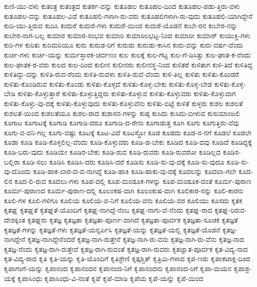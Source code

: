 {ಕುಣಿ-ಯು-ವಳು
ಕುತಂತ್ರ
ಕುತಂತ್ರದ
ಕುತರ್ಕ-ವನ್ನು
ಕುತೂಹಲ
ಕುತೂಹಲ-ದಿಂದ
ಕುತೂಹಲ-ಪಡು-ತ್ತಿರು-ವಳು
ಕುತೂಹಲ-ವನ್ನು
ಕುತೂಹಲ-ವಿದೆ
ಕುತೂಹಲಿ-ಗಳಾಗಿ-ರು-ವರು
ಕುತೂಹಲಿಗಳಾಗಿ-ರು-ವುದು
ಕುತೂಹಲಿ-ಯಾಗಿದ್ದೇನೆ
ಕುದಿ-ಯು-ತ್ತಿರುವ
ಕುದಿಸಿ
ಕುದುರೆ
ಕುದುರೆ-ಗಳು
ಕುದುರೆ-ಯಿಂದ
ಕುದುರೆ-ಯೊಡನೆ
ಕುಬೇ-ರನ
ಕುಬೇರ-ನನ್ನು
ಕುಬೇರ-ನಾಗ-ಬಲ್ಲ
ಕುಮಾರ
ಕುಮಾರ-ಸಂಭವ
ಕುಮಾರಿ
ಕುಮಾರಿಲಭಟ್ಟ-ನಿಂದ
ಕುಮಾರೀ
ಕುಮಾರ್
ಕುಯುಕ್ತಿ-ಗಳು
ಕುರಿ-ಗಳ
ಕುರಿತು
ಕುರಿಮರಿಯೂ
ಕುರು
ಕುರುಡ-ರಿಗೆ
ಕುರುಡು
ಕುರುಡು-ಕಾಸಿನ
ಕುರು-ವನ್ನು
ಕುರು-ವರ್ಷ-ವೆಂದು
ಕುರ್ಚಿ-ಗಳು
ಕುರ್ಚಿ-ಯನ್ನು
ಕುರ್ಮಸ್ತಾರಕ-ಚರ್ವಣಂ
ಕುಲ
ಕುಲಕ್ಕೆ
ಕುಲ-ಗೆಟ್ಟ
ಕುಲ-ಗೆ-ಡಿಸಿತ್ತು
ಕುಲ-ಘಾತ-ಕ-ನೆಂದು
ಕುಲ-ಘಾತಕ-ರ-ವರು
ಕುಲದ
ಕುಲ-ದಿಂದ
ಕುಲೀನ
ಕುಲೀನರು
ಕುಲೀನಸ್ಥ-ನಿಂದ
ಕುಳಿತರೆ
ಕುಳಿತಾಗ
ಕುಳಿ-ತಿದೆ
ಕುಳಿತಿದ್ದ
ಕುಳಿತಿದ್ದು-ದನ್ನು
ಕುಳಿತಿ-ರುವ-ರೆಂದು
ಕುಳಿತಿ-ರುವಳು
ಕುಳಿತಿ-ರುವೆ-ವೆಂದು
ಕುಳಿ-ತಿಲ್ಲ
ಕುಳಿತು
ಕುಳಿತು-ಕೊಂಡರೆ
ಕುಳಿತು-ಕೊಂಡಿರುವ
ಕುಳಿತು-ಕೊಂಡು
ಕುಳಿತು-ಕೊಳ್ಳದೆ
ಕುಳಿತು-ಕೊಳ್ಳ-ಬೇಕು
ಕುಳಿತು-ಕೊಳ್ಳ-ಬೇಡ
ಕುಳಿತು-ಕೊಳ್ಳ-ಬೇಡಿ
ಕುಳಿತು-ಕೊಳ್ಳುತ್ತಾರೆ
ಕುಳಿತು-ಕೊಳ್ಳುತ್ತಿದ್ದರು
ಕುಳಿತು-ಕೊಳ್ಳುವ
ಕುಳಿತು-ಕೊಳ್ಳುವರು
ಕುಳಿತು-ಕೊಳ್ಳುವಾಗ
ಕುಳಿತು-ಕೊಳ್ಳು-ವು-ದಕ್ಕೆ
ಕುಳಿತು-ಕೊಳ್ಳುವುದು
ಕುಳಿತು-ಕೊಳ್ಳುವೆನು
ಕುಳಿತು-ಬಿಟ್ಟೆ
ಕುಳಿತೆ
ಕುಳ್ಳರು
ಕುಶಲ
ಕುಶಲತೆ
ಕುಶಲತೆ-ಯಿಂದ
ಕುಶಲತೆಯೂ
ಕುಶಲ-ರಾದ
ಕುಶಾಸನ-ಗಳನ್ನು
ಕುಷ್ಠ
ಕುಸಿದು
ಕುಸಿದು-ಬೀಳುವ
ಕುಸುಮಾಂಜಲಿ
ಕೂಗಾಟ
ಕೂಗಾಟಕ್ಕೆ
ಕೂಗಾಡಿ
ಕೂಗಾಡಿ-ದರೂ
ಕೂಗಾಡಿ-ದ-ರೇನು
ಕೂಗಾಡುತ್ತ
ಕೂಗಿ
ಕೂಗು
ಕೂಗುತ್ತಿರು-ವೆವು
ಕೂಗು-ವ-ವನಿ-ಗಲ್ಲ
ಕೂಗು-ವಷ್ಟು
ಕೂಟಕ್ಕೆ
ಕೂಟ-ವಿದೆ
ಕೂಟಸ್ಥೋ
ಕೂಡ
ಕೂಡದು
ಕೂಡ-ನ-ನಗೆ
ಕೂಡಲೆ
ಕೂಡಲೇ
ಕೂಡಾ
ಕೂಡಿ
ಕೂಡಿ-ಕೊಳ್ಳಲಿಲ್ಲ-ವೆಂದು
ಕೂಡಿ-ಕೊಳ್ಳುವರು
ಕೂಡಿ-ಡ-ಬೇಕು
ಕೂಡಿದ
ಕೂಡಿ-ದವು
ಕೂಡಿದೆ
ಕೂಡಿದ್ದಕ್ಕೆ
ಕೂಡಿ-ಬರು-ವುದು
ಕೂಡಿಯೇ
ಕೂಡಿರ-ಬೇಕು
ಕೂಡಿ-ರುವ
ಕೂಡಿ-ರುವರು
ಕೂಡಿ-ರುವರೋ
ಕೂಡಿಲ್ಲದ
ಕೂಡಿಸ-ಬಲ್ಲಿರಾ
ಕೂಡಿ-ಸಲು
ಕೂಡಿಸಿ
ಕೂಡಿಸಿ-ದರು
ಕೂಡಿಸಿ-ದರೆ
ಕೂಡಿಸು
ಕೂಡಿ-ಸು-ವು-ದಕ್ಕೆ
ಕೂಡಿ-ಸು-ವುದೂ
ಕೂಡಿ-ಸು-ವು-ದೊಂದು
ಕೂಡಿ-ಹಾಕ-ಲಾರ-ದ-ವ-ನಾಗಿದ್ದೆ
ಕೂಡಿ-ಹಾಕಿ
ಕೂಡಿ-ಹಾಕು-ವು-ದಕ್ಕೆ
ಕೂದಲನ್ನು
ಕೂದಲಾ-ಗಲೇ
ಕೂದ-ಲಿನ
ಕೂದ-ಲಿ-ರುವ
ಕೂದಲು-ಗಳು
ಕೂಪ-ದಲ್ಲಿ
ಕೂಪ-ಮಂಡೂಕ-ಗಳನ್ನು
ಕೂಪ-ಮಂಡೂಕ-ದಂತೆ
ಕೂರ್ಮ-ಪುರಾಣ
ಕೂರ್ಮ-ಪುರಾಣದ
ಕೂರ್ಮ-ಪುರಾಣ-ದಲ್ಲಿ
ಕೂಲಂಕಷ-ವಾಗಿ
ಕೂಲಂಕುಷ-ವಾಗಿ
ಕೂಲಿಕಾರ-ನನ್ನು
ಕೂಲಿ-ಕಾರನು
ಕೂಲಿ-ಗಳ
ಕೂಲಿ-ಗಳಿಗೂ
ಕೂಲಿಯ
ಕೂಲಿಯ-ವ-ನಿಗೆ
ಕೂಲಿಯ-ವನು
ಕೂಲಿಯ-ವರ
ಕೂಲಿಯು
ಕೂಸದು
ಕೃತಕ
ಕೃತಘ್ನ
ಕೃತಘ್ನತೆ
ಕೃತಘ್ನತೆ-ಯೊಂದಿಗೆ
ಕೃತಘ್ನ-ನಾಗಿದ್ದೆ-ನೆಂಬ
ಕೃತಘ್ನ-ನಾಗು-ವೆ-ನೆಂದು
ಕೃತಘ್ನ-ರಾದ
ಕೃತಘ್ನ-ರಿರುವ-ದೇಶಕ್ಕಿಂತ
ಕೃತಘ್ನರು
ಕೃತಜ್ಞ
ಕೃತಜ್ಞತಾ
ಕೃತಜ್ಞತಾ-ಪೂರ್ಣ-ವಾಗಿದೆ
ಕೃತಜ್ಞತಾ-ಪೂರ್ವಕ
ಕೃತಜ್ಞತಾ-ಸೂಚಕ
ಕೃತಜ್ಞತೆ
ಕೃತಜ್ಞತೆ-ಗಳನ್ನು
ಕೃತಜ್ಞತೆ-ಗಳು
ಕೃತಜ್ಞತೆ-ಯನ್ನರ್ಪಿಸಿ
ಕೃತಜ್ಞತೆ-ಯನ್ನು
ಕೃತಜ್ಞತೆ-ಯಲ್ಲಿ
ಕೃತಜ್ಞತೆ-ಯೊಡನೆ
ಕೃತಜ್ಞ-ನಾಗಿದ್ದೇನೆ
ಕೃತಜ್ಞ-ನಾಗಿದ್ದೇನೆಂದರೆ
ಕೃತಜ್ಞ-ನಾಗಿ-ರುತ್ತೇನೆ
ಕೃತಜ್ಞ-ನಾಗಿ-ರು-ವನು
ಕೃತಜ್ಞ-ನಾಗಿ-ರು-ವೆನು
ಕೃತಜ್ಞ-ನಾದ
ಕೃತಜ್ಞ-ನೆಂದು
ಕೃತಜ್ಞ-ರಾಗಿ-ರುತ್ತೇವೆ
ಕೃತಜ್ಞ-ರಾಗಿ-ರುವಂತೆ
ಕೃತಜ್ಞ-ರಾಗಿ-ರುವರು
ಕೃತಜ್ಞಾತ-ಪೂರ್ವಕ
ಕೃತ-ವಿದ್ಯ-ನಾದ
ಕೃತ-ವಿದ್ಯ-ರಾದ
ಕೃತಿ
ಕೃತಿ-ಯನ್ನು
ಕೃತಿ-ಯೊಂದಿಗೆ
ಕೃತಿಶ್ರೇಣಿ
ಕೃತ್ಕಶ್ಚಿತ್
ಕೃತ್ರಿಮಿ-ಗಳಾದ
ಕೃಪ-ಣರು
ಕೃಪಾಕಟಾಕ್ಷ-ದಿಂದ
ಕೃಪಾಗಂಗೆ-ಯನ್ನು
ಕೃಪಾನಂದ
ಕೃಪಾನಂದನ
ಕೃಪಾನಂದ-ನಿಗೆ
ಕೃಪಾನಂದನು
ಕೃಪಾನಂದ-ರಿಗೆ
ಕೃಪಾ-ಮಯನ
ಕೃಪಾಶ್ರ-ಯಕ್ಕೆ
ಕೃಪಾಸಿಂಧು
ಕೃಪಾಸಿಂಧು-ವಿ-ನಂತೆ
ಕೃಪೆ
ಕೃಪೆ-ಮಾಡಿ
ಕೃಪೆಯ
ಕೃಪೆ-ಯನ್ನು
ಕೃಪೆ-ಯಿಂದ
}
